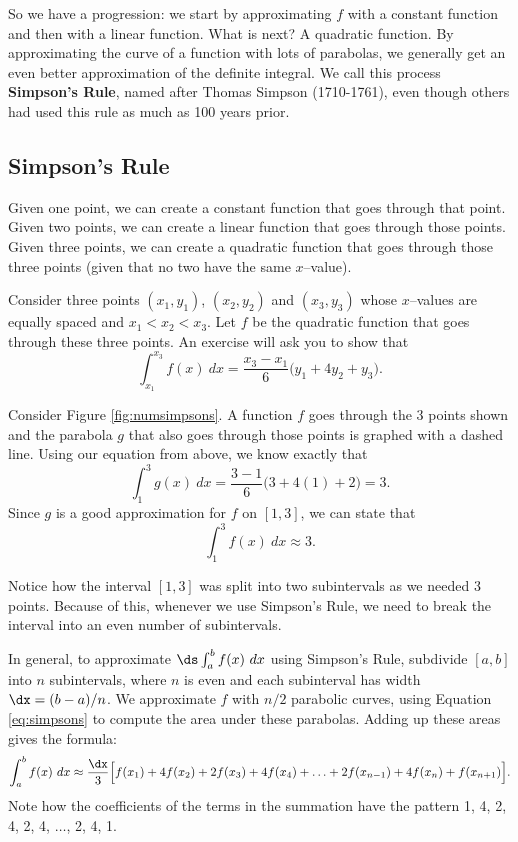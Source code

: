 So we have a progression: we start by approximating $f$ with a constant function and then with a linear function. What is next? A quadratic function. By approximating the curve of a function with lots of parabolas, we generally get an even better approximation of the definite integral. We call this process \textbf{Simpson's Rule}, named after Thomas Simpson (1710-1761), even though others had used this rule as much as 100 years prior.

\subsection*{Simpson's Rule}

Given one point, we can create a constant function that goes through that point. Given two points, we can create a linear function that goes through those points. Given three points, we can create a quadratic function that goes through those three points (given that no two have the same $x$--value).

Consider three points $(x_1,y_1)$, $(x_2,y_2)$ and $(x_3,y_3)$ whose $x$--values are equally spaced and $x_1<x_2<x_3$. Let $f$ be the quadratic function that goes through these three points. An exercise will ask you to show that 
\begin{equation}
\int_{x_1}^{x_3} f(x)\ dx = \frac{x_3-x_1}{6}\big(y_1+4y_2+y_3\big).\label{eq:simpsons}
\end{equation}

Consider Figure \ref{fig:numsimpsons}. A function $f$ goes through the 3 points shown and the parabola $g$ that also goes through those points is graphed with a dashed line. Using our equation from above, we know exactly that $$\int_1^3 g(x) \ dx = \frac{3-1}{6}\big(3+4(1)+2\big)= 3.$$ Since $g$ is a good approximation for $f$ on $[1,3]$, we can state that $$\int_1^3 f(x)\ dx \approx 3.$$


Notice how the interval $[1,3]$ was split into two subintervals as we needed 3 points. Because of this, whenever we use Simpson's Rule, we need to break the interval into an even number of subintervals. 

In general, to approximate $\ds \int_a^b f(x)\ dx$ using Simpson's Rule, subdivide $[a,b]$ into $n$ subintervals, where $n$ is even and each subinterval has width $\dx = (b-a)/n$. We approximate $f$ with $n/2$ parabolic curves, using Equation \eqref{eq:simpsons} to compute the area under these parabolas. Adding up these areas gives the formula:
$$\int_a^b f(x) \ dx \approx \frac{\dx}3
\Big[f(x_1)+4f(x_2)+2f(x_3)+4f(x_4)+\ldots+2f(x_{n-1})+4f(x_n)+f(x_{n+1})\Big].
$$
Note how the coefficients of the terms in the summation have the pattern 1, 4, 2, 4, 2, 4, $\ldots$, 2, 4, 1.

